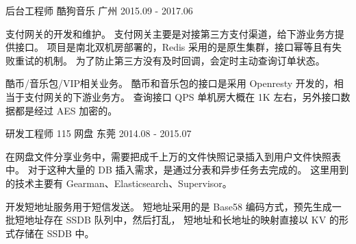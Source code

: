 \begin{cventries}
  \cventry
    {后台工程师} %
    {酷狗音乐} %
    {广州} %
    {2015.09 - 2017.06} %
    {
      \begin{cvitems} %
        \item
        {
          支付⽹关的开发和维护。
          支付网关主要是对接第三⽅⽀付渠道，给下游业务方提供接口。
          项目是南北双机房部署的，Redis 采⽤的是原生集群，接⼝幂等且有失败重试的机制。
          为了防⽌第三⽅没有及时回调，会定时主动查询订单状态。
        }
        \item
        {
          酷币/⾳乐包/VIP相关业务。
          酷币和音乐包的接口是采用 Openresty 开发的，相当于⽀付⽹关的下游业务方。
          查询接口 QPS 单机房大概在 1K 左右，另外接口数据都是经过 AES 加密的。
        }
      \end{cvitems}
    }

  \cventry
    {研发工程师} %
    {115 网盘} %
    {东莞} %
    {2014.08 - 2015.07} %
    {
      \begin{cvitems} %
        \item
        {
          在网盘⽂件分享业务中，需要把成千上万的⽂件快照记录插⼊到⽤户⽂件快照表中。
          对于这种⼤量的 DB 插⼊需求，是通过分表和异步任务去完成的。
          这⾥⽤到的技术主要有 Gearman、Elasticsearch、Supervisor。
        }
        \item
        {
          开发短地址服务用于短信发送。
          短地址采⽤的是 Base58 编码⽅式，预先⽣成⼀批短地址存在 SSDB 队列中，然后打乱，
          短地址和⻓地址的映射直接以 KV 的形式存储在 SSDB 中。
        }
      \end{cvitems}
    }

\end{cventries}
